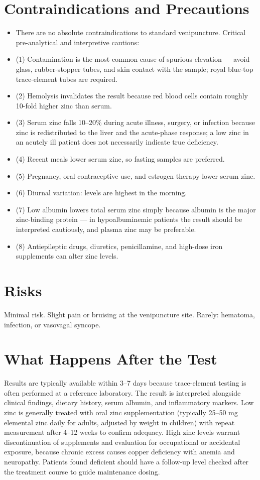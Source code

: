 \section*{Contraindications and Precautions}
\begin{itemize}
  \item There are no absolute contraindications to standard venipuncture. Critical pre-analytical and interpretive cautions:
  \item (1) Contamination is the most common cause of spurious elevation --- avoid glass, rubber-stopper tubes, and skin contact with the sample; royal blue-top trace-element tubes are required.
  \item (2) Hemolysis invalidates the result because red blood cells contain roughly 10-fold higher zinc than serum.
  \item (3) Serum zinc falls 10--20\% during acute illness, surgery, or infection because zinc is redistributed to the liver and the acute-phase response; a low zinc in an acutely ill patient does not necessarily indicate true deficiency.
  \item (4) Recent meals lower serum zinc, so fasting samples are preferred.
  \item (5) Pregnancy, oral contraceptive use, and estrogen therapy lower serum zinc.
  \item (6) Diurnal variation: levels are highest in the morning.
  \item (7) Low albumin lowers total serum zinc simply because albumin is the major zinc-binding protein --- in hypoalbuminemic patients the result should be interpreted cautiously, and plasma zinc may be preferable.
  \item (8) Antiepileptic drugs, diuretics, penicillamine, and high-dose iron supplements can alter zinc levels.
\end{itemize}
\section*{Risks}
Minimal risk. Slight pain or bruising at the venipuncture site. Rarely: hematoma, infection, or vasovagal syncope.

\section*{What Happens After the Test}
Results are typically available within 3--7 days because trace-element testing is often performed at a reference laboratory. The result is interpreted alongside clinical findings, dietary history, serum albumin, and inflammatory markers. Low zinc is generally treated with oral zinc supplementation (typically 25--50 mg elemental zinc daily for adults, adjusted by weight in children) with repeat measurement after 4--12 weeks to confirm adequacy. High zinc levels warrant discontinuation of supplements and evaluation for occupational or accidental exposure, because chronic excess causes copper deficiency with anemia and neuropathy. Patients found deficient should have a follow-up level checked after the treatment course to guide maintenance dosing.

